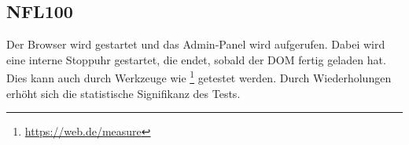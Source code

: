 \subsection*{NFL100}

Der Browser wird gestartet und das Admin-Panel wird aufgerufen.
Dabei wird eine interne Stoppuhr gestartet, die endet, sobald der DOM fertig geladen hat.
Dies kann auch durch Werkzeuge wie \footnote{\href{https://web.dev/measure}{https://web.de/measure}} getestet werden.
Durch Wiederholungen erhöht sich die statistische Signifikanz des Tests.